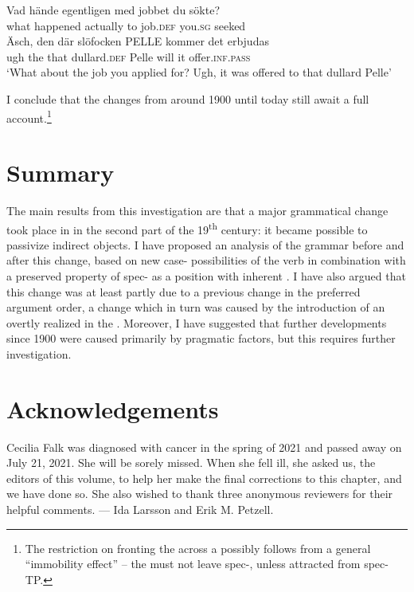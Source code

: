 \documentclass[output=paper]{langscibook}
\begin{document}
\ea%
    \label{ex:falk:28}
\gll Vad    hände    egentligen  med  jobbet    du      sökte?\\
    what    happened  actually    to    job.\textsc{def}  you.\textsc{sg}  seeked\\

\gll Äsch,  den  där  slöfocken    PELLE  kommer  det  erbjudas\\
    ugh    the  that  dullard.\textsc{def}    Pelle    will      it    offer.\textsc{inf.pass}\\
\glt ‘What about the job you applied for? Ugh, it was offered to that dullard Pelle’
\z



I conclude that the changes from around 1900 until today still await a full account.\footnote{The restriction on fronting the  across a  possibly follows from a general “immobility effect” – the  must not leave spec-, unless attracted from spec-TP.}

\section{Summary}\label{sec:falk:6}


The main results from this investigation are that a major grammatical change took place in  in the second part of the 19\textsuperscript{th} century: it became possible to passivize indirect objects. I have proposed an analysis of the grammar before and after this change, based on new case- possibilities of the verb in combination with a preserved property of spec- as a position with inherent . I have also argued that this change was at least partly due to a previous change in the preferred argument order, a change which in turn was caused by the introduction of an overtly realized  in the . Moreover, I have suggested that further developments since 1900 were caused primarily by pragmatic factors, but this requires further investigation.

\section*{Acknowledgements}


Cecilia Falk was diagnosed with cancer in the spring of 2021 and passed away on July 21, 2021. She will be sorely missed. When she fell ill, she asked us, the editors of this volume, to help her make the final corrections to this chapter, and we have done so. She also wished to thank three anonymous reviewers for their helpful comments. \hfill--- Ida Larsson and Erik M. Petzell.\hbox{}\pagebreak
\end{document}
